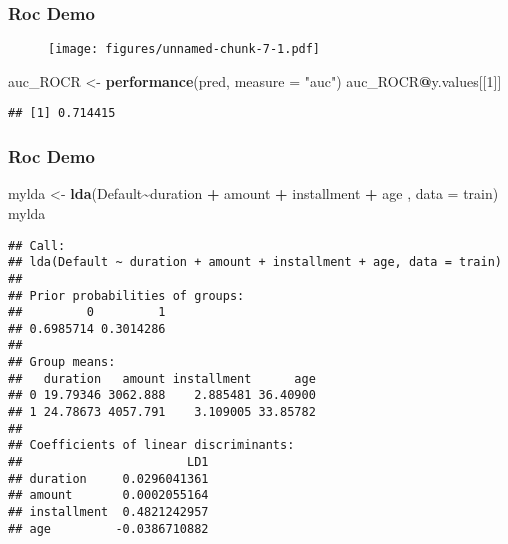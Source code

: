 \documentclass[
  shownotes,
  xcolor={svgnames},
  hyperref={colorlinks,citecolor=DarkBlue,linkcolor=DarkRed,urlcolor=DarkBlue}
  , aspectratio=169]{beamer}
\newenvironment{Shaded}{\begin{snugshade}}{\end{snugshade}}
\newcommand{\DataTypeTok}[1]{\textcolor[rgb]{0.13,0.29,0.53}{#1}}
\newcommand{\DecValTok}[1]{\textcolor[rgb]{0.00,0.00,0.81}{#1}}
\newcommand{\KeywordTok}[1]{\textcolor[rgb]{0.13,0.29,0.53}{\textbf{#1}}}
\newcommand{\NormalTok}[1]{#1}
\newcommand{\OperatorTok}[1]{\textcolor[rgb]{0.81,0.36,0.00}{\textbf{#1}}}
\newcommand{\StringTok}[1]{\textcolor[rgb]{0.31,0.60,0.02}{#1}}
\begin{document}
\begin{frame}[fragile]
\frametitle{Roc Demo}


 \begin{figure}[H] \centering
            \captionsetup{justification=centering}
              \texttt{[image: figures/unnamed-chunk-7-1.pdf]}
 \end{figure}

\begin{scriptsize}
\begin{Shaded}
\begin{Highlighting}[]
\NormalTok{auc\_ROCR \textless{}{-}}\StringTok{ }\KeywordTok{performance}\NormalTok{(pred, }\DataTypeTok{measure =} \StringTok{"auc"}\NormalTok{)}
\NormalTok{auc\_ROCR}\OperatorTok{@}\NormalTok{y.values[[}\DecValTok{1}\NormalTok{]]}
\end{Highlighting}
\end{Shaded}

\begin{verbatim}
## [1] 0.714415
\end{verbatim}
\end{scriptsize}

\end{frame}
\begin{frame}[fragile]
\frametitle{Roc Demo}

\begin{scriptsize}
\begin{Shaded}
\begin{Highlighting}[]
\NormalTok{mylda \textless{}{-}}\StringTok{ }\KeywordTok{lda}\NormalTok{(Default}\OperatorTok{\textasciitilde{}}\NormalTok{duration }\OperatorTok{+}\StringTok{ }\NormalTok{amount }\OperatorTok{+}\StringTok{ }\NormalTok{installment }\OperatorTok{+}\StringTok{ }\NormalTok{age , }\DataTypeTok{data =}\NormalTok{ train)}
\NormalTok{mylda}
\end{Highlighting}
\end{Shaded}
\end{scriptsize}

\begin{tiny}

\begin{verbatim}
## Call:
## lda(Default ~ duration + amount + installment + age, data = train)
## 
## Prior probabilities of groups:
##         0         1 
## 0.6985714 0.3014286 
## 
## Group means:
##   duration   amount installment      age
## 0 19.79346 3062.888    2.885481 36.40900
## 1 24.78673 4057.791    3.109005 33.85782
## 
## Coefficients of linear discriminants:
##                       LD1
## duration     0.0296041361
## amount       0.0002055164
## installment  0.4821242957
## age         -0.0386710882
\end{verbatim}
\end{tiny}

\end{frame}
\end{document}
